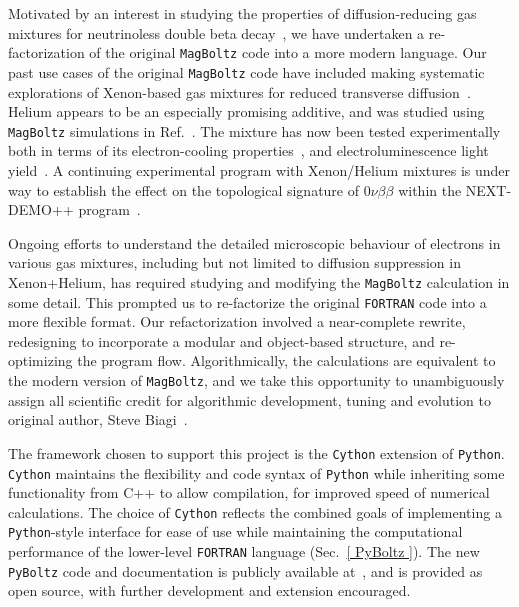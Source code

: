 \documentclass[3p,11pt]{elsarticle}
\begin{document}
Motivated by an interest in studying the properties of diffusion-reducing gas mixtures for neutrinoless double beta decay~\cite{Henriques:2017rlj,Henriques:2018tam,Azevedo:2015eok}, we have undertaken a re-factorization of the original {\tt MagBoltz} code into a more modern language.  Our past use cases of the original {\tt MagBoltz} code have included making systematic explorations of Xenon-based gas mixtures for reduced transverse diffusion~\cite{XePa}.  Helium appears to be an especially promising additive, and was studied using {\tt MagBoltz} simulations in Ref.~\cite{Felkai:2017oeq}. The mixture has now been tested experimentally both in terms of its electron-cooling properties~\cite{McDonald:2019fhy}, and electroluminescence light yield~\cite{Fernandes:2019zuz}.  A continuing experimental program with Xenon/Helium mixtures is under way to establish the effect on the topological signature of $0\nu\beta\beta$ within the NEXT-DEMO++ program~\cite{NeusLIDINE}. 

Ongoing efforts to understand the detailed microscopic behaviour of electrons in various gas mixtures, including but not limited to diffusion suppression in Xenon+Helium, has required studying and modifying the {\tt MagBoltz} calculation in some detail.  This prompted us to re-factorize the original {\tt FORTRAN} code into a more flexible format.  Our refactorization involved a near-complete rewrite, redesigning to incorporate a modular and object-based structure, and re-optimizing the program flow.  Algorithmically, the calculations are equivalent to the modern version of {\tt MagBoltz}, and we take this opportunity to unambiguously assign all scientific credit for algorithmic development, tuning and evolution to original author, Steve Biagi~\cite{biagi1999monte}. 

The framework chosen to support this project is the {\tt Cython} \cite{behnel2011cython} extension of {\tt Python}. {\tt Cython} maintains the flexibility and code syntax of {\tt Python} while inheriting some functionality from C++ to allow compilation, for improved speed of numerical calculations.  The choice of {\tt Cython} reflects the combined goals of implementing a {\tt Python}-style interface for ease of use while maintaining the computational performance of the  lower-level {\tt FORTRAN} language (Sec.~\ref{ PyBoltz }).  The new {\tt PyBoltz} code and documentation is publicly available at~\cite{GitHub}, and is provided as open source, with further development and extension encouraged.
\end{document}
